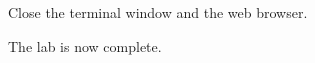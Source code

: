 \documentclass[letterpaper, 12pt]{article}
\begin{document}
\begin{enumerate}
    \begin{labstep}
        Close the terminal window and the web browser.
    \end{labstep}

    \begin{labstep}
        The lab is now complete.
    \end{labstep}

\end{enumerate}
\end{document}
